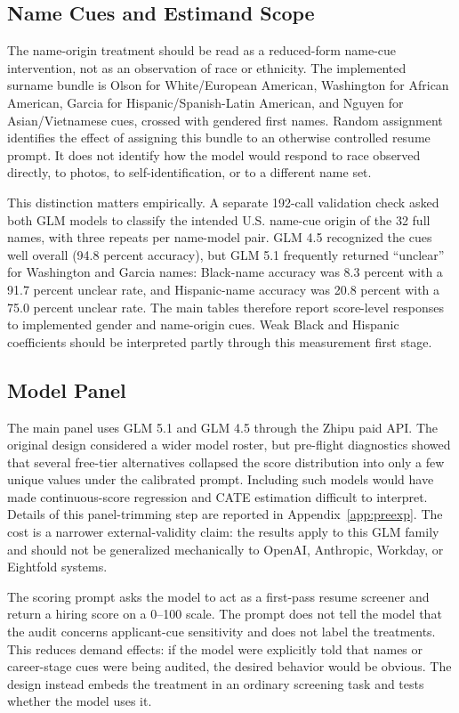 \documentclass[10pt,twocolumn,letterpaper]{article}
\begin{document}
\subsection{Name Cues and Estimand Scope}

The name-origin treatment should be read as a reduced-form name-cue intervention, not as an observation of race or ethnicity. The implemented surname bundle is Olson for White/European American, Washington for African American, Garcia for Hispanic/Spanish-Latin American, and Nguyen for Asian/Vietnamese cues, crossed with gendered first names. Random assignment identifies the effect of assigning this bundle to an otherwise controlled resume prompt. It does not identify how the model would respond to race observed directly, to photos, to self-identification, or to a different name set.

This distinction matters empirically. A separate 192-call validation check asked both GLM models to classify the intended U.S. name-cue origin of the 32 full names, with three repeats per name-model pair. GLM 4.5 recognized the cues well overall (94.8 percent accuracy), but GLM 5.1 frequently returned ``unclear'' for Washington and Garcia names: Black-name accuracy was 8.3 percent with a 91.7 percent unclear rate, and Hispanic-name accuracy was 20.8 percent with a 75.0 percent unclear rate. The main tables therefore report score-level responses to implemented gender and name-origin cues. Weak Black and Hispanic coefficients should be interpreted partly through this measurement first stage.

\subsection{Model Panel}

The main panel uses GLM 5.1 and GLM 4.5 through the Zhipu paid API. The original design considered a wider model roster, but pre-flight diagnostics showed that several free-tier alternatives collapsed the score distribution into only a few unique values under the calibrated prompt. Including such models would have made continuous-score regression and CATE estimation difficult to interpret. Details of this panel-trimming step are reported in Appendix~\ref{app:preexp}. The cost is a narrower external-validity claim: the results apply to this GLM family and should not be generalized mechanically to OpenAI, Anthropic, Workday, or Eightfold systems.

The scoring prompt asks the model to act as a first-pass resume screener and return a hiring score on a 0--100 scale. The prompt does not tell the model that the audit concerns applicant-cue sensitivity and does not label the treatments. This reduces demand effects: if the model were explicitly told that names or career-stage cues were being audited, the desired behavior would be obvious. The design instead embeds the treatment in an ordinary screening task and tests whether the model uses it.
\end{document}
